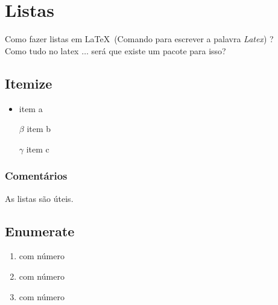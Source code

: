 \documentclass[12pt, a4paper]{article}
\begin{document}
\section{Listas}
Como fazer listas em \LaTeX\ (Comando para escrever a palavra \emph{Latex}) ?	\\
Como tudo no latex $\ldots$ será que existe um pacote para isso? 	

\subsection{Itemize}
\begin{itemize}
\item item a
\item[$\beta$] item b
\item[$\gamma$] item c
\end{itemize}


\subsubsection{Comentários}
As listas são úteis.

\subsection{Enumerate}

\begin{enumerate}
\item com número
\item com número
\item com número
\end{enumerate}
\end{document}
